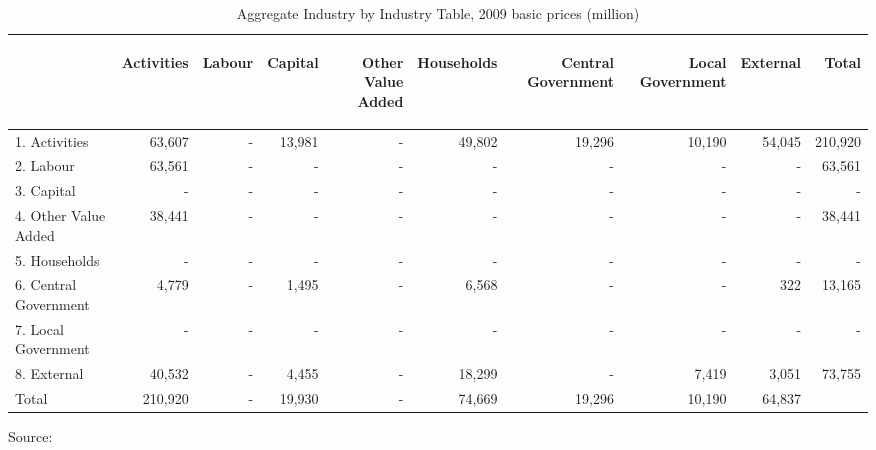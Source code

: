   \begin{table}[H] \caption{Aggregate Industry by Industry Table, 2009 basic prices (\textsterling million)}
  \bigskip \begin{scriptsize} \begin{centering} \begin{doublespacing}
  \begin{tabular}{lrrrrrrrrr}
  \toprule
  & \begin{sideways}Activities \end{sideways} &
  \begin{sideways}Labour \end{sideways} &
  \begin{sideways}Capital \end{sideways} &
  \begin{sideways}Other Value Added \end{sideways} &
  \begin{sideways}Households \end{sideways} &
  \begin{sideways}Central Government \end{sideways} &
  \begin{sideways}Local Government \end{sideways} &
  \begin{sideways}External  \end{sideways} &
  \begin{sideways}Total \end{sideways}  \bigstrut[b]\\
  \hline
  1. Activities &  63,607  & \: \: \: \: \: -  &  13,981  &  \: \: \: \: \: -  &  49,802  &  19,296  &  10,190  &  54,045  &  210,920  \\
  2. Labour &  63,561  &  -  &  -  &  -  &  -  &  -  &  -  &  -  &  63,561  \\
  3. Capital &  -  &  -  &  -  &  -  &  -  &  -  &  -  &  -  &  -  \\
  4. Other Value Added &  38,441  &  -  &  -  &  -  &  -  &  -  &  -  &  -  &  38,441  \\
  5. Households &  -  &  -  &  -  &  -  &  -  &  -  &  -  &  -  &  -  \\
  6. Central Government &    4,779  &  -  &  1,495  &  -  &  6,568  &  -  &   -  &      322  &  13,165  \\
  7. Local Government &  -  &  -  &  -  &  -  &  -  &  -  &  -  &  -  &  -  \\
  8. External &  40,532  &  -  &  4,455  &  -  &  18,299  &  -  &  7,419 & 3,051  &  73,755   \bigstrut[b]\\
  \hline
  Total &  210,920  &  -  &  19,930  &  -  &  74,669  &  19,296  &  10,190  &  64,837  &   \bigstrut[t]\\
      \bottomrule \end{tabular}%
      \bigskip \begin{flushright}Source:  \end{flushright} \label{tab:3.2.1}
      \end{doublespacing} \end{centering} \end{scriptsize} \end{table}

